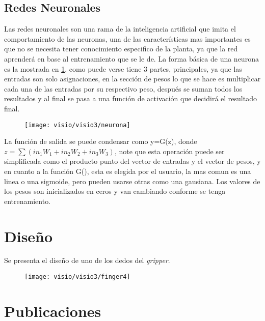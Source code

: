\section{Redes Neuronales}
Las redes neuronales son una rama de la inteligencia artificial que imita el comportamiento de las neuronas, una de las características mas importantes es que no se necesita tener conocimiento especifico de la planta, ya que la red aprenderá en base al entrenamiento que se le de. La forma básica de una neurona es la mostrada en \cref{fig:neurona}, como puede verse tiene 3 partes, principales, ya que las entradas son solo asignaciones, en la sección de pesos lo que se hace es multiplicar cada una de las entradas por su respectivo peso, después se suman todos los resultados y al final se pasa a una función de activación que decidirá el resultado final. 
\begin{figure}[h]
	\centering
	\texttt{[image: visio/visio3/neurona]}
	\caption{}
	\label{fig:neurona}
\end{figure}
La función de salida se puede condensar como y=G(z), donde $ z=\sum(in_1 W_1 + in_2 W_2 + in_3 W_3)$, note que esta operación puede ser simplificada como el producto punto del vector de entradas y el vector de pesos, y en cuanto a la función G(), esta es elegida por el usuario, la mas comun es una linea o una sigmoide, pero pueden usarse otras como una gausiana. Los valores de los pesos son inicializados en ceros y van cambiando conforme se tenga entrenamiento.



\chapter{Diseño}
Se presenta el diseño de uno de los dedos del \textit{gripper}.

\begin{figure}[h]
	\centering
	\texttt{[image: visio/visio3/finger4]}
	\caption{}
	\label{fig:finger4}
\end{figure}

\chapter{Publicaciones}
\cite{tuyinincluded2017}

